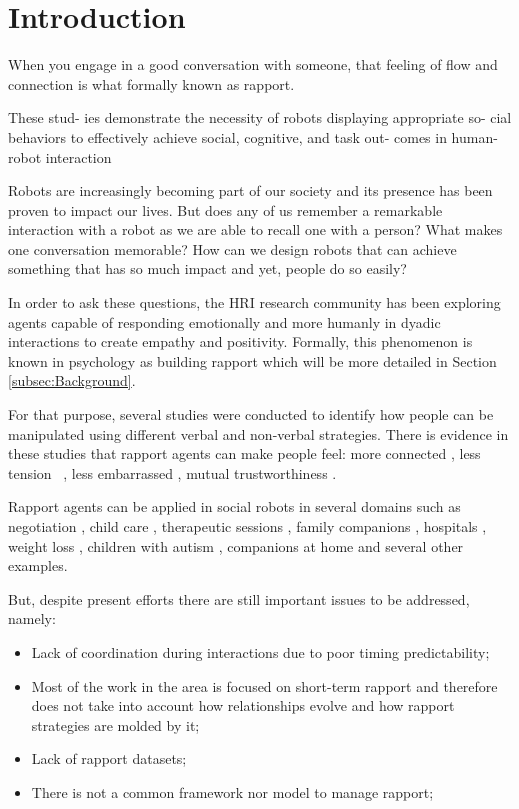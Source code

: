 \section{Introduction}
\label{sec:Introduction}


When you engage in a good conversation with someone, that feeling of flow and connection is what formally known as rapport.

These stud- ies demonstrate the necessity of robots displaying appropriate so- cial behaviors to effectively achieve social, cognitive, and task out- comes in human-robot interaction
%

Robots are increasingly becoming part of our society and its presence has been proven to impact our lives. But does any of us remember a remarkable interaction with a robot as we are able to recall one with a person? What makes one conversation memorable? How can we design robots that can achieve something that has so much impact and yet, people do so easily?

In order to ask these questions, the \ac{HRI} research community has been exploring agents capable of responding emotionally and more humanly in dyadic interactions to create empathy and positivity. Formally, this phenomenon is known in psychology as building rapport which will be more detailed in Section \ref{subsec:Background}. 

For that purpose, several studies were conducted to identify how people can be manipulated using different verbal and non-verbal strategies. There is evidence in these studies that rapport agents can make people feel: more connected \cite{Rosenthal-vonderPutten2013}, less tension ~\cite{Wang2010}, less embarrassed \cite{Kang2009}, mutual trustworthiness \cite{Kang2009}. 

Rapport agents can be applied in social robots in several domains such as negotiation \cite{Nadler2003}, child care \cite{Burns1984}, therapeutic sessions \cite{Lisetti2013}, family companions \cite{Andrist2014, Bickmore2005}, hospitals \cite{Bull1981} \cite{Kang2005}, weight loss \cite{Burroughs2007}, children with autism \cite{Feil-Seifer2009, Scassellati2012}, companions at home \cite{Fasola2012, Marti2006} and several other examples.

But, despite present efforts there are still important issues to be addressed, namely:
\begin{itemize}
	\item Lack of coordination during interactions due to poor timing predictability;
	\item Most of the work in the area is focused on short-term rapport and therefore does not take into account how relationships evolve and how rapport strategies are molded by it;
	\item Lack of rapport datasets;
	\item There is not a common framework nor model to manage rapport;
\end{itemize}

